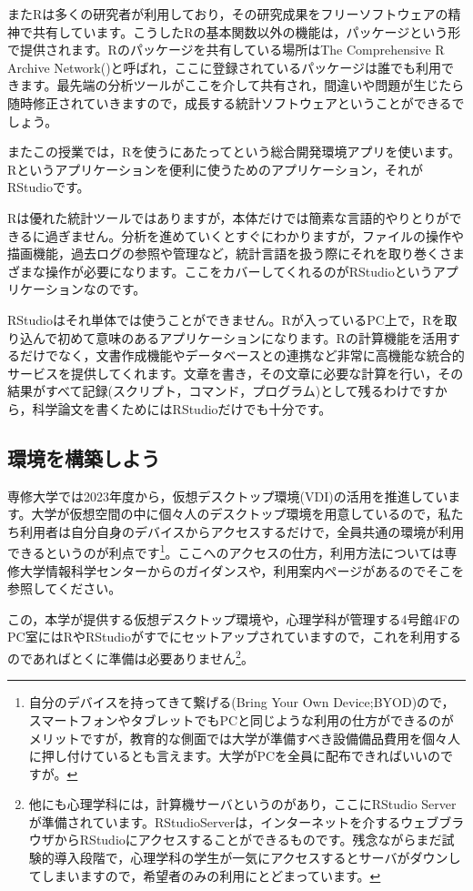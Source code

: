 \documentclass{ltjsbook}
\begin{document}
またRは多くの研究者が利用しており，その研究成果をフリーソフトウェアの精神で共有しています。こうしたRの基本関数以外の機能は，パッケージという形で提供されます。Rのパッケージを共有している場所はThe Comprehensive R Archive Network()と呼ばれ，ここに登録されているパッケージは誰でも利用できます。最先端の分析ツールがここを介して共有され，間違いや問題が生じたら随時修正されていきますので，成長する統計ソフトウェアということができるでしょう。

またこの授業では，Rを使うにあたってという総合開発環境アプリを使います。Rというアプリケーションを便利に使うためのアプリケーション，それがRStudioです。

Rは優れた統計ツールではありますが，本体だけでは簡素な言語的やりとりができるに過ぎません。分析を進めていくとすぐにわかりますが，ファイルの操作や描画機能，過去ログの参照や管理など，統計言語を扱う際にそれを取り巻くさまざまな操作が必要になります。ここをカバーしてくれるのがRStudioというアプリケーションなのです。

RStudioはそれ単体では使うことができません。Rが入っているPC上で，Rを取り込んで初めて意味のあるアプリケーションになります。Rの計算機能を活用するだけでなく，文書作成機能やデータベースとの連携など非常に高機能な統合的サービスを提供してくれます。文章を書き，その文章に必要な計算を行い，その結果がすべて記録(スクリプト，コマンド，プログラム)として残るわけですから，科学論文を書くためにはRStudioだけでも十分です。


\subsection{環境を構築しよう}
専修大学では2023年度から，仮想デスクトップ環境(VDI)の活用を推進しています。大学が仮想空間の中に個々人のデスクトップ環境を用意しているので，私たち利用者は自分自身のデバイスからアクセスするだけで，全員共通の環境が利用できるというのが利点です\footnote{自分のデバイスを持ってきて繋げる(Bring Your Own Device;BYOD)ので，スマートフォンやタブレットでもPCと同じような利用の仕方ができるのがメリットですが，教育的な側面では大学が準備すべき設備備品費用を個々人に押し付けているとも言えます。大学がPCを全員に配布できればいいのですが。}。ここへのアクセスの仕方，利用方法については専修大学情報科学センターからのガイダンスや，利用案内ページがあるのでそこを参照してください。

この，本学が提供する仮想デスクトップ環境や，心理学科が管理する4号館4FのPC室にはRやRStudioがすでにセットアップされていますので，これを利用するのであればとくに準備は必要ありません\footnote{他にも心理学科には，計算機サーバというのがあり，ここにRStudio Serverが準備されています。RStudioServerは，インターネットを介するウェブブラウザからRStudioにアクセスすることができるものです。残念ながらまだ試験的導入段階で，心理学科の学生が一気にアクセスするとサーバがダウンしてしまいますので，希望者のみの利用にとどまっています。}。
\end{document}
